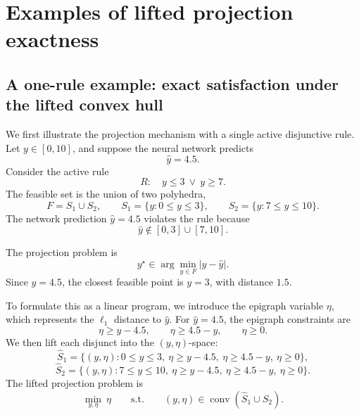 \documentclass{article}
\theoremstyle{plain}
\theoremstyle{definition}
\theoremstyle{remark}
\begin{document}
\section{Examples of lifted projection exactness}
\label{app:projection-examples}

\subsection{A one-rule example: exact satisfaction under the lifted convex hull}
\label{app:one-rule-example}

We first illustrate the projection mechanism with a single active disjunctive rule. Let \(y\in[0,10]\), and suppose the neural network predicts
\[
    \hat y=4.5.
\]
Consider the active rule
\[
    R:\quad y\le 3\ \vee\ y\ge 7.
\]
The feasible set is the union of two polyhedra,
\[
    F=S_1\cup S_2,
    \qquad
    S_1=\{y:0\le y\le 3\},
    \qquad
    S_2=\{y:7\le y\le 10\}.
\]
The network prediction \(\hat y=4.5\) violates the rule because
\[
    \hat y\notin [0,3]\cup[7,10].
\]

The projection problem is
\[
    y^\star
    \in
    \arg\min_{y\in F}
    |y-\hat y|.
\]
Since \(\hat y=4.5\), the closest feasible point is \(y=3\), with distance \(1.5\).

To formulate this as a linear program, we introduce the epigraph variable \(\eta\), which represents the \(\ell_1\) distance to \(\hat y\). For \(\hat y=4.5\), the epigraph constraints are
\[
    \eta\ge y-4.5,
    \qquad
    \eta\ge 4.5-y,
    \qquad
    \eta\ge0.
\]
We then lift each disjunct into the \((y,\eta)\)-space:
\[
    \widehat S_1
    =
    \{(y,\eta):0\le y\le 3,\ \eta\ge y-4.5,\ \eta\ge 4.5-y,\ \eta\ge0\},
\]
\[
    \widehat S_2
    =
    \{(y,\eta):7\le y\le 10,\ \eta\ge y-4.5,\ \eta\ge 4.5-y,\ \eta\ge0\}.
\]
The lifted projection problem is
\[
    \min_{y,\eta}\ \eta
    \qquad
    \mathrm{s.t.}
    \qquad
    (y,\eta)\in\operatorname{conv}(\widehat S_1\cup \widehat S_2).
\]
\end{document}
